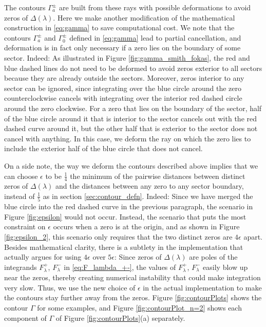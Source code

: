 \documentclass[12pt, oneside, a4paper]{article}
\begin{document}
The contours $\Gamma_a^\pm$ are built from these rays with possible deformations to avoid zeros of $\Delta(\lambda)$. Here we make another modification of the mathematical construction in \eqref{eq:gamma} to save computational cost. We note that the contours $\Gamma_a^\pm$ and $\Gamma_0^\pm$ defined in \eqref{eq:gamma} lead to partial cancellation, and deformation is in fact only necessary if a zero lies on the boundary of some sector. Indeed: As illustrated in Figure \ref{fig:gamma_smith_fokas}, the red and blue dashed lines do not need to be deformed to avoid zeros exterior to all sectors because they are already outside the sectors. Moreover, zeros interior to any sector can be ignored, since integrating over the blue circle around the zero counterclockwise cancels with integrating over the interior red dashed circle around the zero clockwise. For a zero that lies on the boundary of the sector, half of the blue circle around it that is interior to the sector cancels out with the red dashed curve around it, but the other half that is exterior to the sector does not cancel with anything. In this case, we deform the ray on which the zero lies to include the exterior half of the blue circle that does not cancel. 

On a side note, the way we deform the contours described above implies that we can choose $\epsilon$ to be $\frac{1}{4}$ the minimum of the pairwise distances between distinct zeros of $\Delta(\lambda)$ and the distances between any zero to any sector boundary, instead of $\frac{1}{5}$ as in section \ref{sec:contour_defn}. Indeed: Since we have merged the blue circle into the red dashed curve in the previous paragraph, the scenario in Figure \ref{fig:epsilon} would not occur. Instead, the scenario that puts the most constraint on $\epsilon$ occurs when a zero is at the origin, and as shown in Figure \ref{fig:epsilon_2}, this scenario only requires that the two distinct zeros are $4\epsilon$ apart. Besides mathematical clarity, there is a subtlety in the implementation that actually argues for using $4\epsilon$ over $5\epsilon$: Since zeros of $\Delta(\lambda)$ are poles of the integrands $F_\lambda^+$, $F_\lambda^-$ in \eqref{eq:F_lambda_+-}, the values of $F_\lambda^+$, $F_\lambda^-$ easily blow up near the zeros, thereby creating numerical instability that could make integration very slow. Thus, we use the new choice of $\epsilon$ in the actual implementation to make the contours stay further away from the zeros. Figure \ref{fig:contourPlots} shows the contour $\Gamma$ for some examples, and Figure \ref{fig:contourPlot_n=2} shows each component of $\Gamma$ of Figure \ref{fig:contourPlots}(a) separately.
\end{document}
